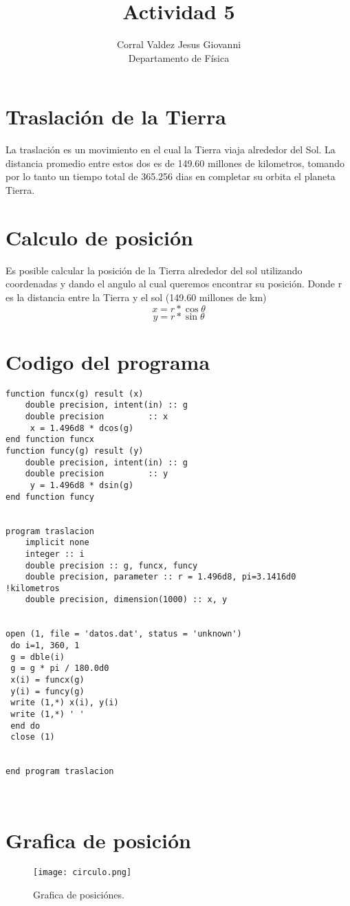 \documentclass{article}
\title{Actividad 5}
\author{Corral Valdez Jesus Giovanni\\
Departamento de Física
}
\begin{document}
\maketitle
\section{Traslación de la Tierra}
La traslación es un movimiento en el cual la Tierra viaja alrededor del Sol. La distancia promedio entre estos dos es de 149.60 millones de kilometros, tomando por lo tanto un tiempo total de 365.256 dias en completar su orbita el planeta Tierra.

\section{Calculo de posición}
Es posible calcular la posición de la Tierra alrededor del sol utilizando coordenadas y dando el angulo al cual queremos encontrar su posición. Donde r es la distancia entre la Tierra y el sol (149.60 millones de km)
\begin{equation}
x= r * \cos\theta
\end{equation}
\begin{equation}
y= r * \sin\theta
\end{equation}

\clearpage
\section{Codigo del programa}
\begin{verbatim}
function funcx(g) result (x)
	double precision, intent(in) :: g
	double precision 	     :: x
	 x = 1.496d8 * dcos(g)
end function funcx
function funcy(g) result (y)
	double precision, intent(in) :: g
	double precision 	     :: y
	 y = 1.496d8 * dsin(g)
end function funcy


program traslacion
	implicit none
	integer :: i
	double precision :: g, funcx, funcy
	double precision, parameter :: r = 1.496d8, pi=3.1416d0 !kilometros
	double precision, dimension(1000) :: x, y

 
open (1, file = 'datos.dat', status = 'unknown')
 do i=1, 360, 1
 g = dble(i)
 g = g * pi / 180.0d0
 x(i) = funcx(g)
 y(i) = funcy(g)
 write (1,*) x(i), y(i)
 write (1,*) ' '
 end do
 close (1)


end program traslacion
   
 
\end{verbatim}
\clearpage
\section{Grafica de posición}
\begin{figure}
  \texttt{[image: circulo.png]}
  \caption{Grafica de posiciónes.}
\end{figure}
\end{document}
